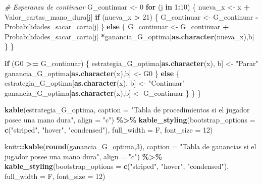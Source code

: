 \documentclass[12pt,a4paper,]{book}
\newenvironment{Shaded}{\begin{snugshade}}{\end{snugshade}}
\newcommand{\AttributeTok}[1]{\textcolor[rgb]{0.13,0.29,0.53}{#1}}
\newcommand{\CommentTok}[1]{\textcolor[rgb]{0.56,0.35,0.01}{\textit{#1}}}
\newcommand{\ControlFlowTok}[1]{\textcolor[rgb]{0.13,0.29,0.53}{\textbf{#1}}}
\newcommand{\DecValTok}[1]{\textcolor[rgb]{0.00,0.00,0.81}{#1}}
\newcommand{\FunctionTok}[1]{\textcolor[rgb]{0.13,0.29,0.53}{\textbf{#1}}}
\newcommand{\NormalTok}[1]{#1}
\newcommand{\OtherTok}[1]{\textcolor[rgb]{0.56,0.35,0.01}{#1}}
\newcommand{\SpecialCharTok}[1]{\textcolor[rgb]{0.81,0.36,0.00}{\textbf{#1}}}
\newcommand{\StringTok}[1]{\textcolor[rgb]{0.31,0.60,0.02}{#1}}
\numberwithin{dummy}{section}
\theoremstyle{ocrenumbox}
\theoremstyle{blacknumex}
\theoremstyle{blacknumbox}
\theoremstyle{ocrenum}
\theoremstyle{ocrenum}
\begin{document}
\begin{Shaded}
\begin{Highlighting}[]
    \CommentTok{\# Esperanza de continuar}
\NormalTok{    G\_continuar }\OtherTok{\textless{}{-}} \DecValTok{0}
    \ControlFlowTok{for}\NormalTok{ (j }\ControlFlowTok{in} \DecValTok{1}\SpecialCharTok{:}\DecValTok{10}\NormalTok{) \{}
\NormalTok{      nueva\_x }\OtherTok{\textless{}{-}}\NormalTok{ x }\SpecialCharTok{+}\NormalTok{ Valor\_cartas\_mano\_dura[j]}
      \ControlFlowTok{if}\NormalTok{ (nueva\_x }\SpecialCharTok{\textgreater{}} \DecValTok{21}\NormalTok{) \{}
\NormalTok{        G\_continuar }\OtherTok{\textless{}{-}}\NormalTok{ G\_continuar }\SpecialCharTok{{-}}\NormalTok{ Probabilidades\_sacar\_carta[j]}
\NormalTok{      \} }\ControlFlowTok{else}\NormalTok{ \{}
\NormalTok{        G\_continuar }\OtherTok{\textless{}{-}}\NormalTok{ G\_continuar }\SpecialCharTok{+}\NormalTok{ Probabilidades\_sacar\_carta[j] }\SpecialCharTok{*}\NormalTok{ganancia\_G\_optima[}\FunctionTok{as.character}\NormalTok{(nueva\_x),b] }
\NormalTok{      \}}
\NormalTok{    \}}
    
    \ControlFlowTok{if}\NormalTok{ (G0 }\SpecialCharTok{\textgreater{}=}\NormalTok{ G\_continuar) \{}
\NormalTok{      estrategia\_G\_optima[}\FunctionTok{as.character}\NormalTok{(x), b] }\OtherTok{\textless{}{-}} \StringTok{"Parar"}
\NormalTok{      ganancia\_G\_optima[}\FunctionTok{as.character}\NormalTok{(x),b] }\OtherTok{\textless{}{-}}\NormalTok{ G0}
\NormalTok{    \} }\ControlFlowTok{else}\NormalTok{ \{}
\NormalTok{      estrategia\_G\_optima[}\FunctionTok{as.character}\NormalTok{(x), b] }\OtherTok{\textless{}{-}} \StringTok{"Continuar"}
\NormalTok{      ganancia\_G\_optima[}\FunctionTok{as.character}\NormalTok{(x),b] }\OtherTok{\textless{}{-}}\NormalTok{ G\_continuar}
\NormalTok{    \}}
\NormalTok{  \}}
\NormalTok{\}}

\FunctionTok{kable}\NormalTok{(estrategia\_G\_optima, }
      \AttributeTok{caption =} \StringTok{"Tabla de procedimientos si el jugador posee una mano dura"}\NormalTok{,}
      \AttributeTok{align =} \StringTok{"c"}\NormalTok{) }\SpecialCharTok{\%\textgreater{}\%}
  \FunctionTok{kable\_styling}\NormalTok{(}\AttributeTok{bootstrap\_options =} \FunctionTok{c}\NormalTok{(}\StringTok{"striped"}\NormalTok{, }\StringTok{"hover"}\NormalTok{, }\StringTok{"condensed"}\NormalTok{),}
                \AttributeTok{full\_width =}\NormalTok{ F, }\AttributeTok{font\_size =} \DecValTok{12}\NormalTok{)}

\NormalTok{knitr}\SpecialCharTok{::}\FunctionTok{kable}\NormalTok{(}\FunctionTok{round}\NormalTok{(ganancia\_G\_optima,}\DecValTok{3}\NormalTok{), }
      \AttributeTok{caption =} \StringTok{"Tabla de ganancias si el jugador posee una mano dura"}\NormalTok{,}
      \AttributeTok{align =} \StringTok{"c"}\NormalTok{) }\SpecialCharTok{\%\textgreater{}\%}
  \FunctionTok{kable\_styling}\NormalTok{(}\AttributeTok{bootstrap\_options =} \FunctionTok{c}\NormalTok{(}\StringTok{"striped"}\NormalTok{, }\StringTok{"hover"}\NormalTok{, }\StringTok{"condensed"}\NormalTok{),}
                \AttributeTok{full\_width =}\NormalTok{ F, }\AttributeTok{font\_size =} \DecValTok{12}\NormalTok{)}
\end{Highlighting}
\end{Shaded}
\end{document}
